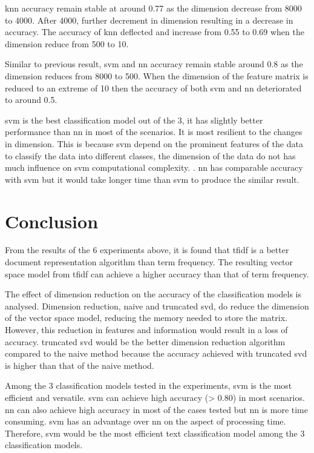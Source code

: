 \Ac{knn} accuracy remain stable at around 0.77 as the dimension decrease from 8000 to 4000. After 4000, further decrement in dimension resulting in a decrease in accuracy. The accuracy of \ac{knn} deflected and increase from 0.55 to 0.69 when the dimension reduce from 500 to 10.

Similar to previous result, \ac{svm} and \ac{nn} accuracy remain stable around 0.8 as the dimension reduces from 8000 to 500. When the dimension of the feature matrix is reduced to an extreme of 10 then the accuracy of both \ac{svm} and \ac{nn} deteriorated to around 0.5.

\Ac{svm} is the best classification model out of the 3, it has slightly better performance than \ac{nn} in most of the scenarios. It is most resilient to the changes in dimension. This is because \ac{svm} depend on the prominent features of the data to classify the data into different classes, the dimension of the data do not has much influence on \ac{svm} computational complexity. \cite{dimRedCat}. \Ac{nn} has comparable accuracy with \ac{svm} but it would take longer time than \ac{svm} to produce the similar result.


\section{Conclusion}
From the results of the 6 experiments above, it is found that \ac{tfidf} is a better document representation algorithm than term frequency. The resulting vector space model from \ac{tfidf} can achieve a higher accuracy than that of term frequency. 

The effect of dimension reduction on the accuracy of the classification models is analysed. Dimension reduction, naive and truncated \ac{svd}, do reduce the dimension of the vector space model, reducing the memory needed to store the matrix. However, this reduction in features and information would result in a loss of accuracy. truncated \ac{svd} would be the better dimension reduction algorithm compared to the naive method because the accuracy achieved with truncated \ac{svd} is higher than that of the naive method.

Among the 3 classification models tested in the experiments, \ac{svm} is the most efficient and versatile. \Ac{svm} can achieve high accuracy (> 0.80) in most scenarios. \Ac{nn} can also achieve high accuracy in most of the cases tested but \ac{nn} is more time consuming. \Ac{svm} has an advantage over \ac{nn} on the aspect of processing time. Therefore, \ac{svm} would be the most efficient text classification model among the 3 classification models.

